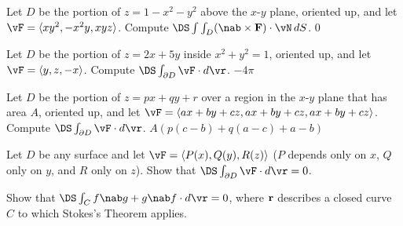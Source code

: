 \begin{multicols}{2}
\problem Let $D$ be the portion of $z=1-x^2-y^2$ above the $x$-$y$ %
plane, oriented up, and let $\vF =\langle
xy^2,-x^2y,xyz\rangle$. Compute $\DS\dint{D} (\nab\times{\bf
F})\cdot \vN \,dS$.
\answer
$0$
\endanswer

\problem Let $D$ be the portion of $z=2x+5y$ inside $x^2+y^2=1$, %
oriented up, and
let $\vF =\langle y,z,-x\rangle$. Compute
$\DS\int_{\partial D} \vF \cdot d\vr $.
\answer
$-4\pi$
\endanswer

\problem Let $D$ be the portion of $z=px+qy+r$ over a region in the %
$x$-$y$ plane that has area $A$, oriented up, and 
let $\vF =\langle ax+by+cz,ax+by+cz,ax+by+cz\rangle$. Compute
$\DS\int_{\partial D} \vF \cdot d\vr $.
\answer
$A(p(c-b)+q(a-c)+a-b)$
\endanswer

\problem Let $D$ be any surface and  %
let $\vF =\langle P(x),Q(y),R(z)\rangle$ ($P$ depends only on $x$,
$Q$ only on $y$, and $R$ only on $z$). Show that
$\DS\int_{\partial D} \vF \cdot d\vr =0$.

\problem Show that $\DS\int_C f\nab g+g\nab f\cdot d\vr =0$, where %
$\bf r$ describes a closed curve $C$ to which Stokes's Theorem
applies.


\end{multicols}

